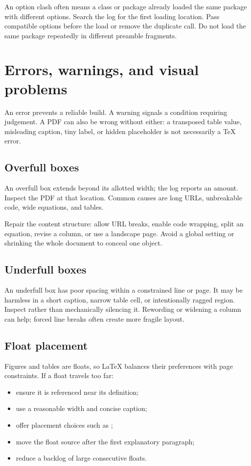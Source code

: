 An option clash often means a class or package already loaded the same package
with different options. Search the log for the first loading location. Pass
compatible options before the load or remove the duplicate call. Do not load
the same package repeatedly in different preamble fragments.

\section{Errors, warnings, and visual problems}

An error prevents a reliable build. A warning signals a condition requiring
judgement. A PDF can also be wrong without either: a transposed table value,
misleading caption, tiny label, or hidden placeholder is not necessarily a TeX
error.

\subsection{Overfull boxes}

An overfull box extends beyond its allotted width; the log reports an amount.
Inspect the PDF at that location. Common causes are long URLs, unbreakable code,
wide equations, and tables.

Repair the content structure: allow URL breaks, enable code wrapping, split an
equation, revise a column, or use a landscape page. Avoid a global
 setting or shrinking the whole document to conceal one object.

\subsection{Underfull boxes}

An underfull box has poor spacing within a constrained line or page. It may be
harmless in a short caption, narrow table cell, or intentionally ragged region.
Inspect rather than mechanically silencing it. Rewording or widening a column
can help; forced line breaks often create more fragile layout.

\subsection{Float placement}

Figures and tables are floats, so \LaTeX{} balances their preferences with page
constraints. If a float travels too far:

\begin{itemize}
  \item ensure it is referenced near its definition;
  \item use a reasonable width and concise caption;
  \item offer placement choices such as \code{[htbp]};
  \item move the float source after the first explanatory paragraph;
  \item reduce a backlog of large consecutive floats.
\end{itemize}

